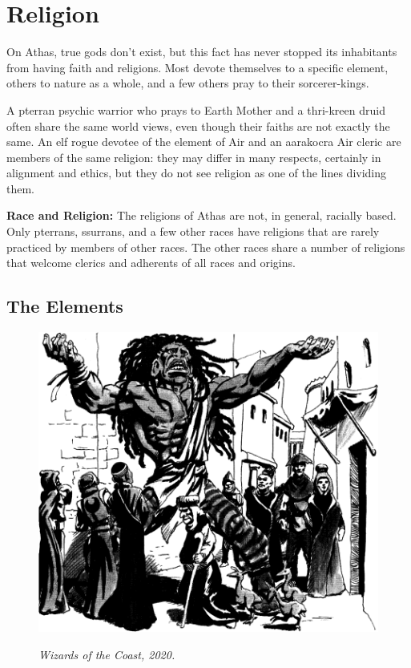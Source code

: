 \section{Religion}
On Athas, true gods don't exist, but this fact has never stopped its inhabitants from having faith and religions. Most devote themselves to a specific element, others to nature as a whole, and a few others pray to their sorcerer-kings.

A pterran psychic warrior who prays to Earth Mother and a thri-kreen druid often share the same world views, even though their faiths are not exactly the same. An elf rogue devotee of the element of Air and an aarakocra Air cleric are members of the same religion: they may differ in many respects, certainly in alignment and ethics, but they do not see religion as one of the lines dividing them.

\textbf{Race and Religion:} The religions of Athas are not, in general, racially based. Only pterrans, ssurrans, and a few other races have religions that are rarely practiced by members of other races. The other races share a number of religions that welcome clerics and adherents of all races and origins.

\subsection{The Elements}
\begin{figure}[b!]
\centering
\includegraphics[height=0.4\paperheight]{images/halfgiant-2.png}
\par\textit{\small\textcopyright Wizards of the Coast, 2020.}
\end{figure}

